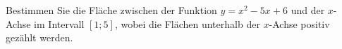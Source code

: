 \item{Bestimmen Sie die Fläche zwischen der Funktion $y=x^2-5x+6$ und der $x$-Achse im Intervall $[1;5]$, wobei die Flächen unterhalb der $x$-Achse positiv gezählt werden.}

